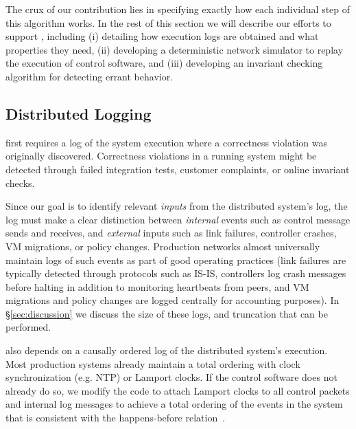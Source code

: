 {The crux of our contribution lies in specifying exactly how each
individual step of this algorithm works. In the rest of this section we will
describe our efforts to support \simulator{}, including (i)
detailing how execution logs are obtained
and what properties they need, (ii) developing a deterministic network simulator
to replay the execution of control software, and (iii) developing an invariant
checking algorithm for detecting errant behavior.

\subsection{Distributed Logging}

\Simulator{} first requires a log of the system execution where a
correctness violation was originally discovered. Correctness violations
in a running system might be detected through failed integration tests,
customer complaints, or online invariant checks. 

Since our goal is to identify
relevant {\em inputs} from the distributed system's log, the log must make a clear
distinction between {\em internal} events such as control message sends and
receives, and {\em external} inputs such as
link failures, controller crashes, VM migrations, or policy changes.
Production networks almost universally maintain logs of such events as part of
good operating practices (link failures are typically detected through
protocols such as IS-IS,
controllers log crash messages before
halting in addition to monitoring heartbeats from peers, and VM migrations and
policy changes are logged centrally for accounting purposes). In
\S\ref{sec:discussion} we discuss the size of these logs, and truncation that can be
performed.

\Simulator{} also depends on a causally ordered log of the
distributed system's execution. Most production systems already maintain a
total ordering with clock synchronization (e.g. NTP) or Lamport clocks. If the control software does not already do
so, we modify the code to attach Lamport
clocks to all
control packets and internal log messages
to achieve a total ordering of the events in the system that
is consistent with the happens-before
relation~\cite{Lamport:1978:TCO:359545.359563}.


}
